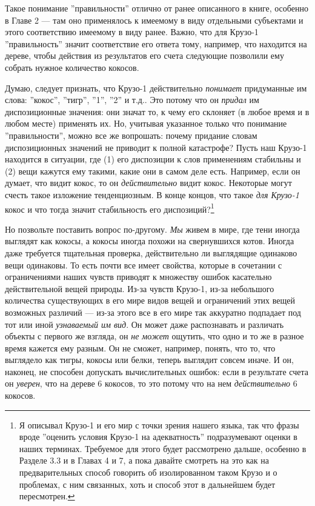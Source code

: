 \documentclass[11pt]{book}
\begin{document}
Такое понимание ''правильности'' отлично от ранее описанного в книге, особенно в Главе 2 --- там оно применялось к имеемому в виду отдельными субъектами и этого соответствию имеемому в виду ранее. Важно, что для Крузо-1 ''правильность'' значит соответствие его ответа тому, например, что находится на дереве, чтобы действия из результатов его счета следующие позволили ему собрать нужное количество кокосов.

Думаю, следует признать, что Крузо-1 действительно \textit{понимает} придуманные им слова: ''кокос'', ''тигр'', ''1'', ''2'' и т.д.. Это потому что он \textit{придал} им диспозиционные значения: они значат то, к чему его склоняет (в любое время и в любом месте) применять их. Но, учитывая указанное только что понимание ''правильности'', можно все же вопрошать: почему придание словам диспозиционных значений не приводит к полной катастрофе? Пусть наш Крузо-1 находится в ситуации, где (1) его диспозиции к слов применениям стабильны и (2) вещи кажутся ему такими, какие они в самом деле есть. Например, если он думает, что видит кокос, то он \textit{действительно} видит кокос. Некоторые могут счесть такое изложение тенденциозным. В конце концов, что такое \textit{для Крузо-1} кокос и что тогда значит стабильность его диспозиций?\footnote{Я описывал Крузо-1 и его мир с точки зрения нашего языка, так что фразы вроде ''оценить условия Крузо-1 на адекватность'' подразумевают оценки в наших терминах. Требуемое для этого будет рассмотрено дальше, особенно в Разделе 3.3 и в Главах 4 и 7, а пока давайте смотреть на это как на предварительных способ говорить об изолированном таком Крузо и о проблемах, с ним связанных, хоть и способ этот в дальнейшем будет пересмотрен.}

Но позвольте поставить вопрос по-другому. \textit{Мы} живем в мире, где тени иногда выглядят как кокосы, а кокосы иногда похожи на свернувшихся котов. Иногда даже требуется тщательная проверка, действительно ли выглядящие одинаково вещи одинаковы. То есть почти все имеет свойства, которые в сочетании с ограничениями наших чувств приводят к множеству ошибок касательно действительной вещей природы. Из-за чувств Крузо-1, из-за небольшого количества существующих в его мире видов вещей и ограничений этих вещей возможных различий --- из-за этого все в его мире так аккуратно подпадает под тот или иной \textit{узнаваемый им вид}. Он может даже распознавать и различать объекты с первого же взгляда, он \textit{не может} ощутить, что одно и то же в разное время кажется ему разным. Он не сможет, например, понять, что то, что выглядело как тигры, кокосы или белки, теперь выглядит совсем иначе. И он, наконец, не способен допускать вычислительных ошибок: если в результате счета он \textit{уверен}, что на дереве 6 кокосов, то это потому что на нем \textit{действительно} 6 кокосов.
\end{document}
